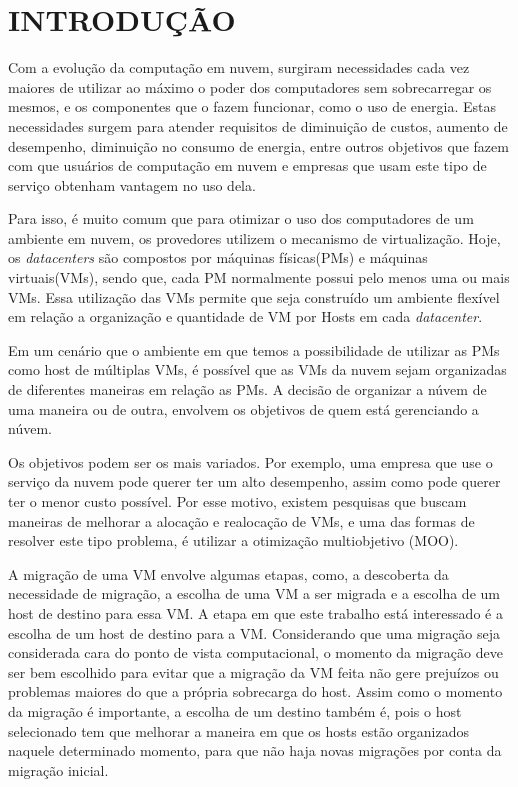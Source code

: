 \chapter{INTRODUÇÃO}
\label{chap:introducao}

Com a evolução da computação em nuvem, surgiram necessidades cada vez maiores de utilizar ao 
máximo o poder dos computadores sem sobrecarregar os mesmos, e os componentes que o fazem funcionar,
como o uso de energia. Estas necessidades surgem para atender 
requisitos de diminuição de custos, aumento de desempenho, diminuição no consumo de energia,
entre outros objetivos que fazem com que usuários de computação em nuvem e empresas que usam 
este tipo de serviço obtenham vantagem no uso dela.

Para isso, é muito comum que para otimizar o uso dos computadores de um ambiente em nuvem, 
os provedores utilizem o mecanismo de virtualização. Hoje, os \textit{datacenters} são compostos 
por máquinas físicas(PMs) e máquinas virtuais(VMs), sendo que, cada PM normalmente possui 
pelo menos uma ou mais VMs. Essa utilização das VMs permite que seja construído um ambiente flexível
em relação a organização e quantidade de VM por Hosts em cada \textit{datacenter}.

Em um cenário que o ambiente em que temos a possibilidade de utilizar as PMs como host de múltiplas VMs,
é possível que as VMs da nuvem sejam organizadas de diferentes maneiras em relação as PMs. A decisão
de organizar a núvem de uma maneira ou de outra, envolvem os objetivos de quem está gerenciando a núvem. 
 
 Os objetivos podem ser os mais variados. Por exemplo, uma empresa que 
 use o serviço da nuvem pode querer ter um alto desempenho, assim como pode querer ter o menor custo 
 possível. Por esse motivo, existem pesquisas que buscam maneiras de melhorar a alocação e realocação de VMs,
 e uma das formas de resolver este tipo problema, é utilizar a otimização multiobjetivo (MOO). 

A migração de uma VM envolve algumas etapas, como, a descoberta da necessidade de migração, 
a escolha de uma VM a ser migrada e a escolha de um host de destino para essa VM.
A etapa em que este trabalho está interessado é a escolha de um host de destino para a VM. 
Considerando que uma migração seja considerada cara do ponto de vista computacional, 
o momento da migração deve ser bem escolhido para evitar que a migração da VM feita não gere  
prejuízos ou problemas maiores do que a própria sobrecarga do host. 
Assim como o momento da migração é importante, a escolha de um destino também é, 
pois o host selecionado tem que melhorar a maneira em que os hosts estão organizados naquele determinado momento, 
para que não haja novas migrações por conta da migração inicial.

